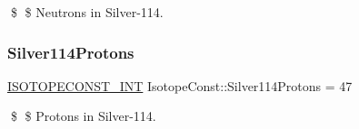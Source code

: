 \$ \$ Neutrons in Silver-\/114. \mbox{\label{group___isotope_const-_silver-_ag114_gabc399b94bdac4c96d9b6780a72a3ffe4}} 
\subsubsection{\texorpdfstring{Silver114\+Protons}{Silver114Protons}}
{\footnotesize\ttfamily \mbox{\hyperlink{group___isotope_const-_macros_ga5f18360b3e99483a35c32d789e62621c}{I\+S\+O\+T\+O\+P\+E\+C\+O\+N\+S\+T\+\_\+\+I\+NT}} Isotope\+Const\+::\+Silver114\+Protons = 47}

\$ \$ Protons in Silver-\/114. 